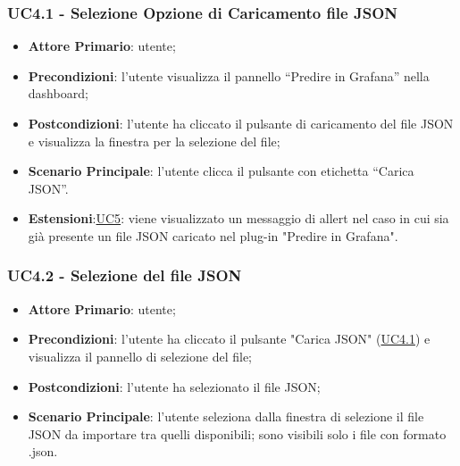		\label{par:UC4.1}
		\subsubsection{UC4.1 - Selezione Opzione di Caricamento file JSON}
		\begin{itemize}
			\item\textbf{Attore Primario}: utente;
			\item\textbf{Precondizioni}: l’utente visualizza il pannello “Predire in Grafana” nella dashboard;
			\item\textbf{Postcondizioni}: l’utente ha cliccato il pulsante di caricamento del file JSON e visualizza la finestra per la selezione del file;
			\item\textbf{Scenario Principale}: l’utente clicca il pulsante con etichetta  “Carica JSON”.
			\item\textbf{Estensioni}:\hyperref[par:UC5]{UC5}: viene visualizzato un messaggio di allert nel caso in cui sia già presente un file JSON caricato nel plug-in "Predire in Grafana".
		\end{itemize}		
		
		\label{par:UC4.2}
		\subsubsection{UC4.2 - Selezione del file JSON}
		\begin{itemize}
			\item\textbf{Attore Primario}: utente;
			\item\textbf{Precondizioni}: l’utente ha cliccato il pulsante "Carica JSON" (\hyperref[par:UC4.1]{UC4.1}) e visualizza il pannello di selezione del file;
			\item\textbf{Postcondizioni}: l’utente ha selezionato il file JSON;
			\item\textbf{Scenario Principale}: l’utente seleziona dalla finestra di selezione il file JSON da importare tra quelli disponibili; sono visibili solo i file con formato .json.
		\end{itemize}
		
		\label{par:UC4.3}
